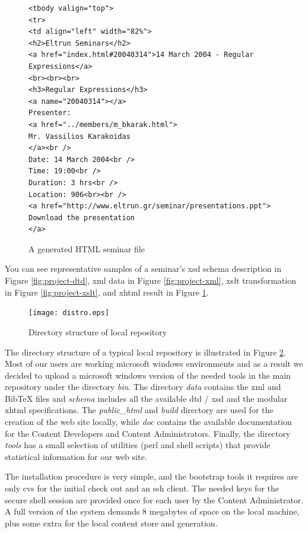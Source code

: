 \documentclass[10pt]{article}
\begin{document}
\begin{figure}
\lstset{language=MYLANG,basicstyle=\ttfamily}
{\begin{lstlisting}
<tbody valign="top">
<tr>
<td align="left" width="82%">
<h2>Eltrun Seminars</h2>
<a href="index.html#20040314">14 March 2004 - Regular Expressions</a>
<br><br><br>
<h3>Regular Expressions</h3>
<a name="20040314"></a>
Presenter: 
<a href="../members/m_bkarak.html">
Mr. Vassilios Karakoidas
</a><br />
Date: 14 March 2004<br />
Time: 19:00<br />
Duration: 3 hrs<br />
Location: 906<br><br />
<a href="http://www.eltrun.gr/seminar/presentations.ppt">
Download the presentation
</a>
\end{lstlisting}}
\caption{A generated HTML seminar file}
\label{fig:project-html}
\end{figure}

You can see representative samples of a seminar's
{\sc xsd} schema description in Figure \ref{fig:project-dtd},
{\sc xml} data in Figure \ref{fig:project-xml},
{\sc xslt} transformation in Figure \ref{fig:project-xslt},
and {\sc xhtml} result in Figure \ref{fig:project-html}.

\begin{figure}
\texttt{[image: distro.eps]}
\caption{Directory structure of local repository}
\label{fig:eltrun-web-distro}
\end{figure}

The directory structure of a typical 
local repository is illustrated in Figure \ref{fig:eltrun-web-distro}.
Most of our users are working {\sc microsoft windows} environments and as 
a result we decided to upload a {\sc microsoft windows} version of the needed tools 
in the main repository under the directory \textit{bin}.
The directory \textit{data} contains the {\sc xml} and {\sc BibTeX} files and \textit{schema}
includes all the available {\sc dtd / xsd} and the modular {\sc xhtml} specifications.
The \textit{public\_html} and \textit{build} directory are used for the creation of the 
web site locally, while \textit{doc} contains the available documentation for the Content Developers
and Content Administrators. Finally, the directory \textit{tools} has a small selection 
of utilities ({\sc perl} and shell scripts) that provide statistical information
for our web site.

The installation procedure is very simple,
and the bootstrap tools it requires are only {\sc cvs} for 
the initial check out and an {\sc ssh} client. The needed keys 
for the secure shell session are provided once for each user by the Content Administrator. 
A full version of the system demands 8 megabytes of space 
on the local machine, plus some extra for the local content store and generation.
\end{document}
